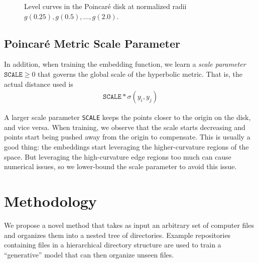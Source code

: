 \documentclass{article}
\begin{document}
\begin{figure}[H]
  \centering
  \caption{Level curves in the Poincaré disk at normalized radii $g(0.25), g(0.5), \dots, g(2.0)$.}
  \label{fig:poincare-level-curves}
\end{figure}

\subsection{Poincaré Metric Scale Parameter}

In addition, when training the embedding function, we learn a \emph{scale parameter} $\texttt{SCALE} \geq 0$ that governs the global scale of the hyperbolic metric. That is, the actual distance used is
\begin{align}
  \texttt{SCALE} * \sigma(y_i, y_j)
\end{align}

A larger scale parameter \texttt{SCALE} keeps the points closer to the origin on the disk, and vice versa. When training, we observe that the scale starts decreasing and points start being pushed away from the origin to compensate. This is usually a good thing: the embeddings start leveraging the higher-curvature regions of the space. But leveraging the high-curvature edge regions too much can cause numerical issues, so we lower-bound the scale parameter to avoid this issue.

\section{Methodology}

We propose a novel method that takes as input an arbitrary set of computer files and organizes them into a nested tree of directories. Example repositories containing files in a hierarchical directory structure are used to train a ``generative'' model that can then organize unseen files.
\end{document}

